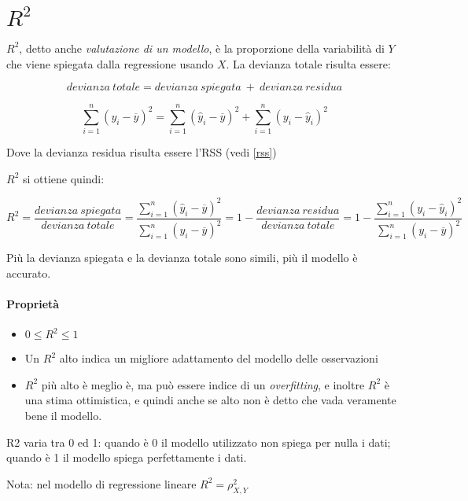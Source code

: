 \section{$R^2$}

$R^2$, detto anche \textit{valutazione di un modello}, \`e la proporzione della 
variabilit\`a di $Y$ che viene spiegata dalla regressione usando $X$.
La devianza totale risulta essere:

\[ devianza\ totale = devianza\ spiegata\ +\ devianza\ residua\]

\[ \sum_{i=1}^n (y_i - \overline{y})^2 = \sum_{i=1}^n (\hat{y}_i - 
\overline{y})^2 + \sum_{i=1}^n (y_i - \hat{y}_i)^2 \]

Dove la devianza residua risulta essere l'RSS (vedi \ref{rss})

$R^2$ si ottiene quindi:

\[ R^2 = \frac{devianza\ spiegata}{devianza\ totale} = \frac{\sum_{i=1}^n 
(\hat{y}_i - \overline{y})^2}{\sum_{i=1}^n (y_i - \overline{y})^2} = 1 - 
\frac{devianza\ residua}{devianza\ totale} = 1 - \frac{\sum_{i=1}^n (y_i - 
\hat{y}_i)^2}{\sum_{i=1}^n (y_i - \overline{y})^2} \]

Più la devianza spiegata e la devianza totale sono simili, più il modello è
accurato.

\paragraph*{Propriet\`a}
\begin{itemize}
 \item $0 \le R^2 \le 1$
 \item Un $R^2$ alto indica un migliore adattamento del modello delle 
osservazioni
 \item $R^2$ pi\`u alto \`e meglio \`e, ma pu\`o essere indice di un
\textit{overfitting}, e inoltre $R^2$ \`e una stima ottimistica, e quindi anche 
se alto non \`e detto che vada veramente bene il modello.
\end{itemize}

R2 varia tra 0 ed 1: quando è 0 il modello utilizzato non spiega per
nulla i dati; quando è 1 il modello spiega perfettamente i dati.

Nota: nel modello di regressione lineare $R^2 = \rho_{X,Y}^2$
